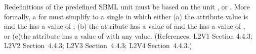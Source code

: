 Redefinitions of the predefined SBML unit  must be based on
the unit ,  or .
More formally, a \UnitDefinition for  must simplify to a
single \Unit in which either (a) the 
attribute value is  and the  has a value of
; (b) the  attribute has a value of
 and the  has a value of , or (c)the
 attribute has a value of  with
any  value.  (References: L2V1 Section 4.4.3; L2V2
Section~4.4.3; L2V3 Section~4.4.3; L2V4 Section~4.4.3.)
